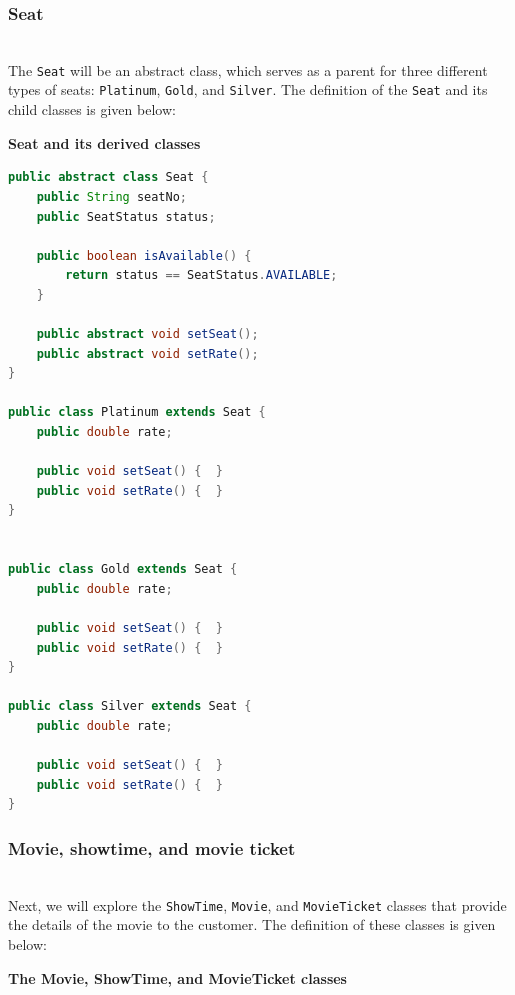 \subsubsection{Seat}\label{xtCDzm3CjAYkbkCE3SoJG}
\\
The \texttt{Seat} will be an abstract class, which serves as a parent for three different types of seats: \texttt{Platinum}, \texttt{Gold}, and \texttt{Silver}. The definition of the \texttt{Seat} and its child classes is given below:

\textbf{Seat and its derived classes}

\begin{lstlisting}[language=Java]
public abstract class Seat {
    public String seatNo;
    public SeatStatus status;

    public boolean isAvailable() {
        return status == SeatStatus.AVAILABLE;
    }

    public abstract void setSeat();
    public abstract void setRate();
}

public class Platinum extends Seat {
    public double rate;

    public void setSeat() {  }
    public void setRate() {  }
}


public class Gold extends Seat {
    public double rate;

    public void setSeat() {  }
    public void setRate() {  }
}

public class Silver extends Seat {
    public double rate;

    public void setSeat() {  }
    public void setRate() {  }
}
\end{lstlisting}

\subsubsection{Movie, showtime, and movie ticket}\label{nieGCA-Z5d957gBzuNk9h}
\\
Next, we will explore the \texttt{ShowTime}, \texttt{Movie}, and \texttt{MovieTicket} classes that provide the details of the movie to the customer. The definition of these classes is given below:

\textbf{The Movie, ShowTime, and MovieTicket classes}

